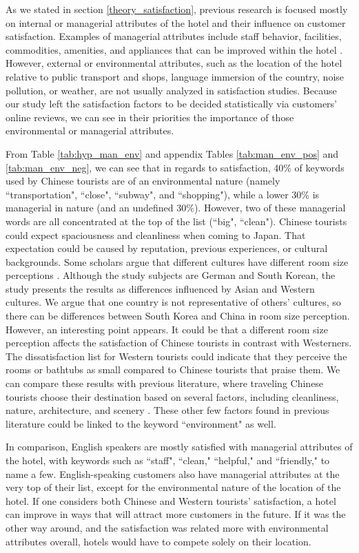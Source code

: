 \documentclass[smallextended,natbib]{svjour3}       %
\begin{document}
    As we stated in section \ref{theory_satisfaction}, previous research is focused mostly on internal or managerial attributes of the hotel and their influence on customer satisfaction. Examples of managerial attributes include staff behavior, facilities, commodities, amenities, and appliances that can be improved within the hotel \cite[e.g.][]{shanka2004, choi2001}. However, external or environmental attributes, such as the location of the hotel relative to public transport and shops, language immersion of the country, noise pollution, or weather, are not usually analyzed in satisfaction studies. Because our study left the satisfaction factors to be decided statistically via customers' online reviews, we can see in their priorities the importance of those environmental or managerial attributes. 

    From Table \ref{tab:hyp_man_env} and appendix Tables \ref{tab:man_env_pos} and \ref{tab:man_env_neg}, we can see that in regards to satisfaction, 40\% of keywords used by Chinese tourists are of an environmental nature (namely ``transportation", ``close", ``subway", and ``shopping"), while a lower 30\% is managerial in nature (and an undefined 30\%). However, two of these managerial words are all concentrated at the top of the list (``big", ``clean"). Chinese tourists could expect spaciousness and cleanliness when coming to Japan. That expectation could be caused by reputation, previous experiences, or cultural backgrounds. Some scholars argue that different cultures have different room size perceptions \cite{Saulton2017}. Although the study subjects are German and South Korean, the study presents the results as differences influenced by Asian and Western cultures. We argue that one country is not representative of others' cultures, so there can be differences between South Korea and China in room size perception. However, an interesting point appears. It could be that a different room size perception affects the satisfaction of Chinese tourists in contrast with Westerners. The dissatisfaction list for Western tourists could indicate that they perceive the rooms or bathtubs as small compared to Chinese tourists that praise them. We can compare these results with previous literature, where traveling Chinese tourists choose their destination based on several factors, including cleanliness, nature, architecture, and scenery \cite[][]{ryan2001}. These other few factors found in previous literature could be linked to the keyword ``environment" as well.

    In comparison, English speakers are mostly satisfied with managerial attributes of the hotel, with keywords such as ``staff", ``clean," ``helpful," and ``friendly," to name a few. English-speaking customers also have managerial attributes at the very top of their list, except for the environmental nature of the location of the hotel. If one considers both Chinese and Western tourists' satisfaction, a hotel can improve in ways that will attract more customers in the future. If it was the other way around, and the satisfaction was related more with environmental attributes overall, hotels would have to compete solely on their location. 
\end{document}
